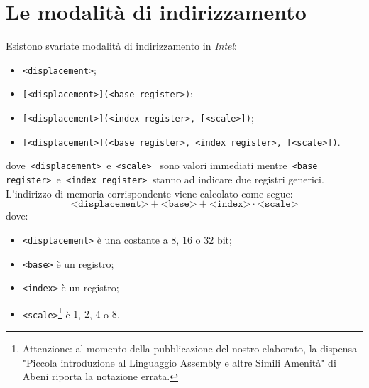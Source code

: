 \section{Le modalità di indirizzamento}
Esistono svariate modalità di indirizzamento in \emph{Intel}:
\begin{itemize}
	\item \texttt{<displacement>};
	\item \texttt{[<displacement>](<base register>)};
	\item \texttt{[<displacement>](<index register>, [<scale>])};
	\item \texttt{[<displacement>](<base register>, <index register>, [<scale>])}.
\end{itemize}
dove\texttt{ <displacement> }e\texttt{ <scale> } sono valori immediati mentre\texttt{ <base register> }e\texttt{ <index register> }stanno ad indicare due registri generici. L'indirizzo di memoria corrispondente viene calcolato come segue:
\begin{equation*}
	\texttt{<displacement>} + \texttt{<base>} + \texttt{<index>} \cdot\texttt{<scale>}
\end{equation*}
dove:
\begin{itemize}
	\item \texttt{<displacement>} è una costante a \(8\), \(16\) o \(32\) bit;
	\item \texttt{<base>} è un registro;
	\item \texttt{<index>} è un registro;
	\item \texttt{<scale>}\footnote{Attenzione: al momento della pubblicazione del nostro elaborato, la dispensa "Piccola introduzione al Linguaggio Assembly e altre Simili Amenità" di Abeni riporta la notazione errata.} è \(1\), \(2\), \(4\) o \(8\).
\end{itemize}

